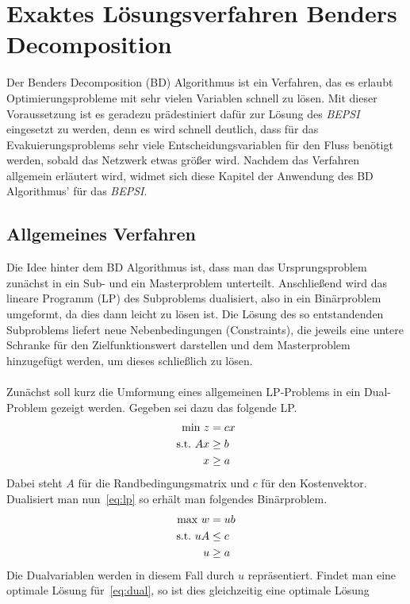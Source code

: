 \documentclass[a4paper, 11pt]{scrreprt}
\begin{document}
\chapter{Exaktes Lösungsverfahren Benders Decomposition}
Der Benders Decomposition (BD) Algorithmus ist ein Verfahren, das es erlaubt Optimierungsprobleme
mit sehr vielen Variablen schnell zu lösen. Mit dieser Voraussetzung ist es geradezu prädestiniert
dafür zur Lösung des \textit{BEPSI} eingesetzt zu werden, denn es wird schnell deutlich, dass für
das Evakuierungsproblems sehr viele Entscheidungsvariablen für den Fluss benötigt werden,
sobald das Netzwerk etwas größer wird.
Nachdem das Verfahren allgemein erläutert wird, widmet sich diese Kapitel der Anwendung
des BD Algorithmus' für das \textit{BEPSI}.

\section{Allgemeines Verfahren}
Die Idee hinter dem BD Algorithmus ist, dass man das Ursprungsproblem zunächst in ein
Sub- und ein Masterproblem unterteilt. Anschließend wird das lineare Programm (LP) des
Subproblems dualisiert, also in ein Binärproblem umgeformt, da dies dann leicht zu lösen ist.
Die Lösung des so entstandenden Subproblems liefert neue Nebenbedingungen (Constraints), die
jeweils eine untere Schranke für den Zielfunktionswert darstellen und dem
Masterproblem hinzugefügt werden, um dieses schließlich zu lösen.\\
\\
Zunächst soll kurz die Umformung eines allgemeinen LP-Problems in ein Dual-Problem gezeigt werden.
Gegeben sei dazu das folgende LP.
\begin{align}
  \label{eq:lp}
  \text{min}\,\, z &= cx\notag\\
  \text{s.t.}\,\, Ax &\geq b\\
  x &\geq a\notag
\end{align}
Dabei steht $A$ für die Randbedingungsmatrix und $c$ für den Kostenvektor.
Dualisiert man nun~\ref{eq:lp} so erhält man folgendes Binärproblem.
\begin{align}
  \label{eq:dual}
  \text{max}\,\, w &= ub\notag\\
  \text{s.t.}\,\, uA &\leq c\\
  u &\geq a\notag
\end{align}
Die Dualvariablen werden in diesem Fall durch $u$ repräsentiert. Findet man eine
optimale Lösung für~\ref{eq:dual}, so ist dies gleichzeitig eine optimale Lösung
\end{document}
